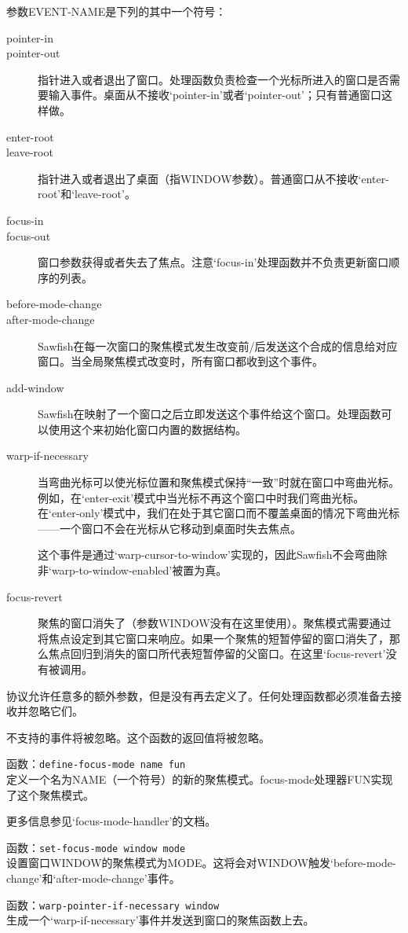 \documentclass{book}
\begin{document}
\begin{CJK*}{UTF8}{gbsn}
\begin{description}
参数EVENT-NAME是下列的其中一个符号：
\begin{description}
\item[pointer-in] 
\item[pointer-out] 指针进入或者退出了窗口。处理函数负责检查一个光标所进入的窗口是否需要输入事件。桌面从不接收`pointer-in'或者`pointer-out'；只有普通窗口这样做。
\item[enter-root] 
\item[leave-root] 指针进入或者退出了桌面（指WINDOW参数）。普通窗口从不接收`enter-root'和`leave-root'。
\item[focus-in] 
\item[focus-out] 窗口参数获得或者失去了焦点。注意`focus-in'处理函数并不负责更新窗口顺序的列表。
\item[before-mode-change] 
\item[after-mode-change] Sawfish在每一次窗口的聚焦模式发生改变前/后发送这个合成的信息给对应窗口。当全局聚焦模式改变时，所有窗口都收到这个事件。
\item[add-window] Sawfish在映射了一个窗口之后立即发送这个事件给这个窗口。处理函数可以使用这个来初始化窗口内置的数据结构。
\item[warp-if-necessary] 当弯曲光标可以使光标位置和聚焦模式保持``一致''时就在窗口中弯曲光标。例如，在`enter-exit'模式中当光标不再这个窗口中时我们弯曲光标。在`enter-only'模式中，我们在处于其它窗口而不覆盖桌面的情况下弯曲光标------一个窗口不会在光标从它移动到桌面时失去焦点。

这个事件是通过`warp-cursor-to-window'实现的，因此Sawfish不会弯曲除非`warp-to-window-enabled'被置为真。
\item[focus-revert] 聚焦的窗口消失了（参数WINDOW没有在这里使用）。聚焦模式需要通过将焦点设定到其它窗口来响应。如果一个聚焦的短暂停留的窗口消失了，那么焦点回归到消失的窗口所代表短暂停留的父窗口。在这里`focus-revert'没有被调用。
\end{description}

协议允许任意多的额外参数，但是没有再去定义了。任何处理函数都必须准备去接收并忽略它们。

不支持的事件将被忽略。这个函数的返回值将被忽略。
\item[-{}-] 函数：\verb|define-focus-mode name fun|\\
定义一个名为NAME（一个符号）的新的聚焦模式。focus-mode处理器FUN实现了这个聚焦模式。

更多信息参见`focus-mode-handler'的文档。
\item[-{}-] 函数：\verb|set-focus-mode window mode|\\
设置窗口WINDOW的聚焦模式为MODE。这将会对WINDOW触发`before-mode-change'和`after-mode-change'事件。
\item[-{}-] 函数：\verb|warp-pointer-if-necessary window|\\
生成一个`warp-if-necessary'事件并发送到窗口的聚焦函数上去。


\end{description}
\end{CJK*}
\end{document}
